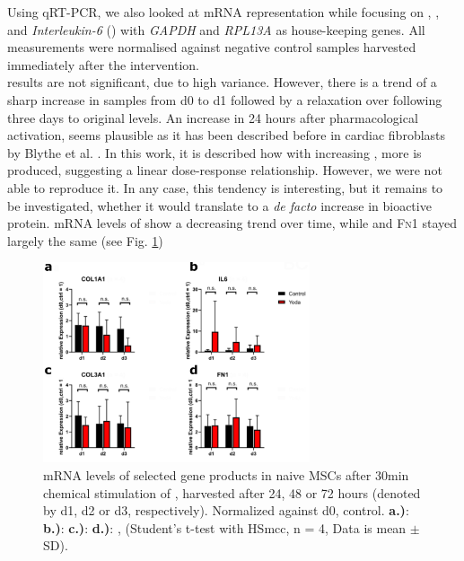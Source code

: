 Using qRT-PCR, we also looked at mRNA representation while focusing on \coloneGene{}, \colthreeGene{}, \FnGene{} and \textit{Interleukin-6} (\ILGene{}) with \textit{GAPDH} and \textit{RPL13A} as house-keeping genes. All measurements were normalised against negative control samples harvested immediately after the intervention. \\
\ILGene{} results are not significant, due to high variance. However, there is a trend of a sharp increase in \Yoda{} samples from d0 to d1 followed by a relaxation over following three days to original levels. An increase in \ILGene{} 24 hours after pharmacological \Piezo{} activation, seems plausible as it has been described before in cardiac fibroblasts by Blythe et al. \cite{Blythe2019}. In this work, it is described how with increasing \Yoda{}, more \ILGene{} is produced, suggesting a linear dose-response relationship. However, we were not able to reproduce it. In any case, this tendency is interesting, but it remains to be investigated, whether it would translate to a \textit{de facto} increase in bioactive \IL protein. mRNA levels of \colone{} show a decreasing trend over time, while \colthree and \textsc{Fn}1 stayed largely the same (see Fig. \ref{fig:Yoda_Norm_PCR})\par



\begin{figure}[ht]
	\centering
	\includegraphics[width = 0.7\textwidth]{NormalYodaExp_PCR.png}
	\caption{mRNA levels of selected gene products in naive MSCs after 30min chemical stimulation of \Piezo{}, harvested after 24, 48 or 72 hours (denoted by d1, d2 or d3, respectively). Normalized against d0, control.
	    \textbf{a.)}: \coloneGene{}
		\textbf{b.)}: \ILGene{}
		\textbf{c.)}: \colthreeGene{}
		\textbf{d.)}: \FnGene, 
		(Student's t-test with HSmcc, n = 4, Data is mean $\pm$ SD). 
	}
	\label{fig:Yoda_Norm_PCR}
\end{figure}


